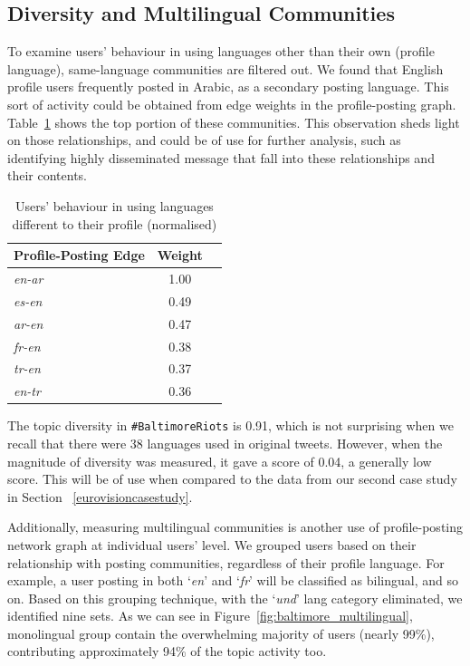 \documentclass{llncs}
\begin{document}
\subsection{Diversity and Multilingual Communities}

To examine users' behaviour in using languages other than their own
(profile language), same-language communities are filtered out.  We
found that English profile users frequently posted in Arabic, as a
secondary posting language. This sort of activity could be obtained
from edge weights in the profile-posting
graph. Table~\ref{tbl:baltimoredifflang} shows the top portion of
these communities. This observation sheds light on those
relationships, and could be of use for further analysis, such as
identifying highly disseminated message that fall into these
relationships and their contents.

\begin{table}[!htb]
\centering
\begin{tabular}{@{}lcr@{}}
\toprule
\textbf{Profile-Posting Edge} & \textbf{Weight} \\ \midrule
{\emph{en-ar}} & 1.00 \\
{\emph{es-en}} & 0.49 \\
{\emph{ar-en}} & 0.47\\ 
{\emph{fr-en}} & 0.38 \\
{\emph{tr-en}} & 0.37 \\
{\emph{en-tr}} & 0.36 \\ \bottomrule
\end{tabular}
\caption{Users' behaviour in using languages different to their profile (normalised)}
\label{tbl:baltimoredifflang}
\end{table}

The topic diversity in {\texttt{\#BaltimoreRiots}} is 0.91, which is
not surprising when we recall that there were 38 languages used in
original tweets. However, when the magnitude of diversity was
measured, it gave a score of 0.04, a generally low score. This will be
of use when compared to the data from our second case study in Section
~\ref{eurovisioncasestudy}.

Additionally, measuring multilingual communities is another use of
profile-posting network graph at individual users' level. We grouped
users based on their relationship with posting communities, regardless
of their profile language. For example, a user posting in both
`{\emph{en}}' and `{\emph{fr}}' will be classified as bilingual, and
so on. Based on this grouping technique, with the `{\emph{und}}' lang
category eliminated, we identified nine sets. As we can see in
Figure~\ref{fig:baltimore_multilingual}, monolingual group contain the
overwhelming majority of users (nearly 99\%), contributing
approximately 94\% of the topic activity too.
\end{document}
